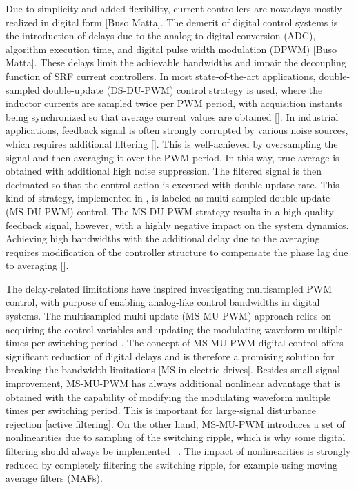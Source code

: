 \documentclass[journal]{IEEEtran}
\begin{document}
Due to simplicity and added flexibility, current controllers are nowadays mostly realized in digital form [Buso Matta]. The demerit of digital control systems is the introduction of delays due to the analog-to-digital conversion (ADC), algorithm execution time, and digital pulse width modulation (DPWM) [Buso Matta]. These delays limit the achievable bandwidths and impair the decoupling function of SRF current controllers. 
In most state-of-the-art applications, double-sampled double-update (DS-DU-PWM) control strategy is used, where the inductor currents are sampled twice per PWM period, with acquisition instants being synchronized so that average current values are obtained []. In industrial applications, feedback signal is often strongly corrupted by various noise sources, which requires additional filtering []. This is well-achieved by oversampling the signal and then averaging it over the PWM period. In this way, true-average is obtained with additional high noise suppression. The filtered signal is then decimated so that the control action is executed with double-update rate. This kind of strategy, implemented in \cite{vuksa2016}, is labeled as multi-sampled double-update (MS-DU-PWM) control. The MS-DU-PWM strategy results in a high quality feedback signal, however, with a highly negative impact on the system dynamics. Achieving high bandwidths with the additional delay due to the averaging requires modification of the controller structure to compensate the phase lag due to averaging [].

The delay-related limitations have inspired investigating multisampled PWM control, with purpose of enabling analog-like control bandwidths in digital systems. The multisampled multi-update (MS-MU-PWM) approach relies on acquiring the control variables and updating the modulating waveform multiple times per switching period \cite{corradini_analysis}. The concept of MS-MU-PWM digital control offers significant reduction of digital delays and is therefore a promising solution for breaking the bandwidth limitations \cite{corradini2018} [MS in electric drives]. Besides small-signal improvement, MS-MU-PWM has always additional nonlinear advantage that is obtained with the capability of modifying the modulating waveform multiple times per switching period. This is important for large-signal disturbance rejection [active filtering]. On the other hand, MS-MU-PWM introduces a set of nonlinearities due to sampling of the switching ripple, which is why some digital filtering should always be implemented ~\cite{petric2020,petric2021}. The impact of nonlinearities is strongly reduced by completely filtering the switching ripple, for example using moving average filters (MAFs).
\end{document}
